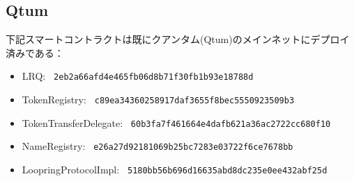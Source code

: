 \documentclass{article}
\begin{document}
\begin{appendices}
\subsection{Qtum}
下記スマートコントラクトは既にクアンタム(Qtum)のメインネットにデプロイ済みである：
\begin{itemize}
\item LRQ: \verb| 2eb2a66afd4e465fb06d8b71f30fb1b93e18788d |
\item TokenRegistry: \verb| c89ea34360258917daf3655f8bec5550923509b3 |
\item TokenTransferDelegate: \verb| 60b3fa7f461664e4dafb621a36ac2722cc680f10 |
\item NameRegistry: \verb| e26a27d92181069b25bc7283e03722f6ce7678bb |
\item LoopringProtocolImpl: \verb| 5180bb56b696d16635abd8dc235e0ee432abf25d |
\end{itemize}

\end{appendices}
\end{document}
